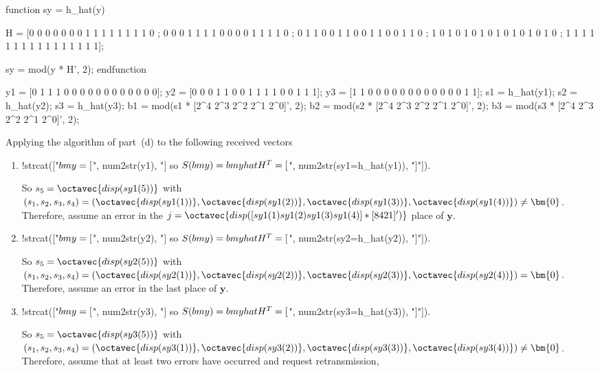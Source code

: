 \begin{octavecode}
function sy = h_hat(y)
  
      H =  [0  0  0  0  0  0  0  1  1  1  1  1  1  1  1  0 ; 
            0  0  0  1  1  1  1  0  0  0  0  1  1  1  1  0 ; 
            0  1  1  0  0  1  1  0  0  1  1  0  0  1  1  0 ; 
            1  0  1  0  1  0  1  0  1  0  1  0  1  0  1  0 ;
            1  1  1  1  1  1  1  1  1  1  1  1  1  1  1  1];
            
      sy = mod(y * H', 2);
endfunction

y1 = [0 1 1 1 0 0 0 0 0 0 0 0 0 0 0 0];
y2 = [0 0 0 1 1 0 0 1 1 1 1 0 0 1 1 1];
y3 = [1 1 0 0 0 0 0 0 0 0 0 0 0 0 1 1];
s1 = h_hat(y1);
s2 = h_hat(y2);
s3 = h_hat(y3);
b1 = mod(s1 * [2^4 2^3 2^2 2^1 2^0]', 2);
b2 = mod(s2 * [2^4 2^3 2^2 2^1 2^0]', 2);
b3 = mod(s3 * [2^4 2^3 2^2 2^1 2^0]', 2);

\end{octavecode}
Applying the algorithm of part~(d) to the following received vectors
\begin{enumerate}
\item
\begin{octavesub}
!{strcat(["$\\bm{y} = [$", num2str(y1), "$]$ so $S(\\bm{y}) = \\bm{y}\\hat{H}^T =[$", num2str(sy1=h_hat(y1)), "]"])}.
\end{octavesub}
So $s_5 = \octavec{disp(sy1(5))}$ with $(s_1, s_2, s_3, s_4) = (\octavec{disp(sy1(1))}, \octavec{disp(sy1(2))}, \octavec{disp(sy1(3))}, \octavec{disp(sy1(4))})\not=\bm{0}$. Therefore, assume an error in the  $ j = \octavec{disp([sy1(1) sy1(2) sy1(3) sy1(4)]*[8 4 2 1]')}$ place of $\bm{y}$.
\item
\begin{octavesub}
!{strcat(["$\\bm{y} = [$", num2str(y2), "$]$ so $S(\\bm{y}) = \\bm{y}\\hat{H}^T =[$", num2str(sy2=h_hat(y2)), "]"])}.
\end{octavesub}
So $s_5 = \octavec{disp(sy2(5))}$ with $(s_1, s_2, s_3, s_4) = (\octavec{disp(sy2(1))}, \octavec{disp(sy2(2))}, \octavec{disp(sy2(3))}, \octavec{disp(sy2(4))})=\bm{0}$. Therefore, assume an error in the last place of $\bm{y}$.
\item
\begin{octavesub}
!{strcat(["$\\bm{y} = [$", num2str(y3), "$]$ so $S(\\bm{y}) = \\bm{y}\\hat{H}^T =[$", num2str(sy3=h_hat(y3)), "]"])}.
\end{octavesub}
So $s_5 = \octavec{disp(sy3(5))}$ with $(s_1, s_2, s_3, s_4) = (\octavec{disp(sy3(1))}, \octavec{disp(sy3(2))}, \octavec{disp(sy3(3))}, \octavec{disp(sy3(4))})\not=\bm{0}$. Therefore, assume that at least two errors have occurred and request retransmission,
\end{enumerate}

